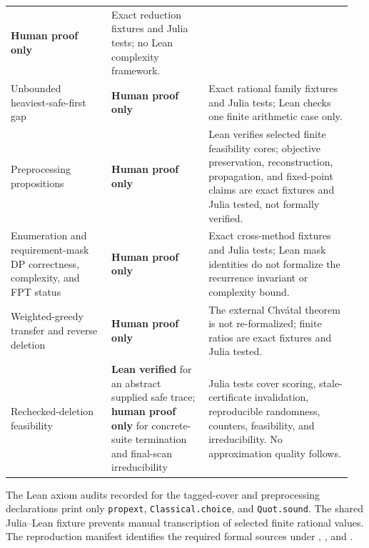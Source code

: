 \begin{longtable}{@{}>{\raggedright\arraybackslash}p{0.28\linewidth}>{\raggedright\arraybackslash}p{0.27\linewidth}>{\raggedright\arraybackslash}p{0.40\linewidth}@{}}
\textbf{Human proof only} & Exact reduction fixtures and Julia tests; no Lean
complexity framework. \\
Unbounded heaviest-safe-first gap &
\textbf{Human proof only} & Exact rational family fixtures and Julia tests;
Lean checks one finite arithmetic case only. \\
Preprocessing propositions &
\textbf{Human proof only} & Lean verifies selected finite feasibility cores;
objective preservation, reconstruction, propagation, and fixed-point claims
are exact fixtures and Julia tested, not formally verified. \\
Enumeration and requirement-mask DP correctness, complexity, and FPT status & \textbf{Human proof only} & Exact cross-method fixtures and Julia
tests; Lean mask identities do not formalize the recurrence invariant or
complexity bound. \\
Weighted-greedy transfer and reverse deletion &
\textbf{Human proof only} & The external Chv\'atal theorem is not re-formalized;
finite ratios are exact fixtures and Julia tested. \\
Rechecked-deletion feasibility &
\textbf{Lean verified} for an abstract supplied safe trace; \textbf{human proof
only} for concrete-suite termination and final-scan irreducibility & Julia
tests cover scoring, stale-certificate invalidation, reproducible randomness,
counters, feasibility, and irreducibility. No approximation quality follows. \\
\bottomrule
\end{longtable}
\endgroup

The Lean axiom audits recorded for the tagged-cover and preprocessing
declarations print only \texttt{propext}, \texttt{Classical.choice}, and
\texttt{Quot.sound}. The shared Julia--Lean fixture prevents manual
transcription of selected finite rational values. The reproduction manifest identifies the required formal sources under
,
, and
.
